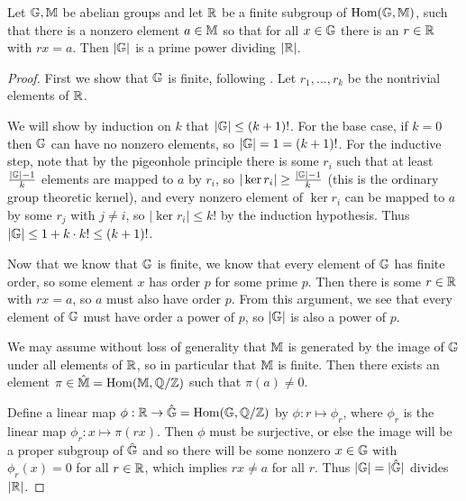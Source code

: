 \documentclass[letterpaper,11pt]{article}
\DeclareMathOperator{\Hom}{Hom}
\begin{document}
\begin{prop} Let $\mathbb{G},\mathbb{M}$ be abelian groups and let $\mathbb{R}$ be a finite subgroup of $\Hom(\bG,\bM)$, such that there is a nonzero element $a \in \mathbb{M}$ so that for all $x \in \mathbb{G}$ there is an $r \in \mathbb{R}$ with $rx = a$. Then $|\mathbb{G}|$ is a prime power dividing $|\mathbb{R}|$.
\end{prop}
\begin{proof} First we show that $\mathbb{G}$ is finite, following \cite{commutator-theory}. Let $r_1, ..., r_k$ be the nontrivial elements of $\mathbb{R}$.

We will show by induction on $k$ that $|\mathbb{G}| \le (k+1)!$. For the base case, if $k = 0$ then $\mathbb{G}$ can have no nonzero elements, so $|\mathbb{G}| = 1 = (k+1)!$. For the inductive step, note that by the pigeonhole principle there is some $r_i$ such that at least $\frac{|\mathbb{G}|-1}{k}$ elements are mapped to $a$ by $r_i$, so $|\ker r_i| \ge \frac{|\mathbb{G}|-1}{k}$ (this is the ordinary group theoretic kernel), and every nonzero element of $\ker r_i$ can be mapped to $a$ by some $r_j$ with $j \ne i$, so $|\ker r_i| \le k!$ by the induction hypothesis. Thus $|\mathbb{G}| \le 1 + k\cdot k! \le (k+1)!$.

Now that we know that $\mathbb{G}$ is finite, we know that every element of $\mathbb{G}$ has finite order, so some element $x$ has order $p$ for some prime $p$. Then there is some $r \in \mathbb{R}$ with $rx = a$, so $a$ must also have order $p$. From this argument, we see that every element of $\mathbb{G}$ must have order a power of $p$, so $|\mathbb{G}|$ is also a power of $p$.%

We may assume without loss of generality that $\mathbb{M}$ is generated by the image of $\mathbb{G}$ under all elements of $\mathbb{R}$, so in particular that $\mathbb{M}$ is finite. Then there exists an element $\pi \in \hat{\bM} = \Hom(\bM,\QQ/\ZZ)$ such that $\pi(a) \ne 0$.

Define a linear map $\phi : \RR \rightarrow \hat{\bG} = \Hom(\bG,\QQ/\ZZ)$ by $\phi : r \mapsto \phi_r$, where $\phi_r$ is the linear map $\phi_r: x \mapsto \pi(rx)$. Then $\phi$ must be surjective, or else the image will be a proper subgroup of $\hat{\mathbb{G}}$ and so there will be some nonzero $x \in \mathbb{G}$ with $\phi_r(x) = 0$ for all $r \in \mathbb{R}$, which implies $rx \ne a$ for all $r$. Thus $|\mathbb{G}| = |\hat{\mathbb{G}}|$ divides $|\mathbb{R}|$.
\end{proof}
\end{document}
